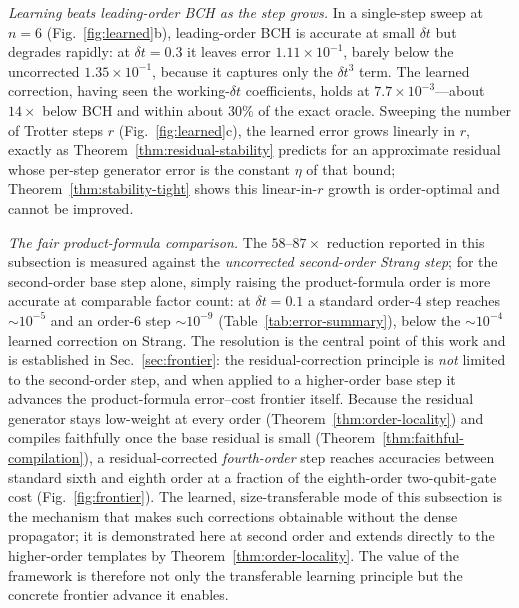 \documentclass[aps,prresearch,reprint,superscriptaddress,nofootinbib,amsmath,amssymb]{revtex4-2}
\newcommand{\dt}{\delta t}
\begin{document}
\emph{Learning beats leading-order BCH as the step grows.} In a single-step sweep at $n=6$ (Fig.~\ref{fig:learned}b), leading-order BCH is accurate at small $\dt$ but degrades rapidly: at $\dt=0.3$ it leaves error $1.11\times10^{-1}$, barely below the uncorrected $1.35\times10^{-1}$, because it captures only the $\dt^3$ term. The learned correction, having seen the working-$\dt$ coefficients, holds at $7.7\times10^{-3}$---about $14\times$ below BCH and within about $30\%$ of the exact oracle. Sweeping the number of Trotter steps $r$ (Fig.~\ref{fig:learned}c), the learned error grows linearly in $r$, exactly as Theorem~\ref{thm:residual-stability} predicts for an approximate residual whose per-step generator error is the constant $\eta$ of that bound; Theorem~\ref{thm:stability-tight} shows this linear-in-$r$ growth is order-optimal and cannot be improved.

\emph{The fair product-formula comparison.} The $58$--$87\times$ reduction reported in this subsection is measured against the \emph{uncorrected second-order Strang step}; for the second-order base step alone, simply raising the product-formula order is more accurate at comparable factor count: at $\dt=0.1$ a standard order-4 step reaches $\sim10^{-5}$ and an order-6 step $\sim10^{-9}$ (Table~\ref{tab:error-summary}), below the $\sim10^{-4}$ learned correction on Strang. The resolution is the central point of this work and is established in Sec.~\ref{sec:frontier}: the residual-correction principle is \emph{not} limited to the second-order step, and when applied to a higher-order base step it advances the product-formula error--cost frontier itself. Because the residual generator stays low-weight at every order (Theorem~\ref{thm:order-locality}) and compiles faithfully once the base residual is small (Theorem~\ref{thm:faithful-compilation}), a residual-corrected \emph{fourth-order} step reaches accuracies between standard sixth and eighth order at a fraction of the eighth-order two-qubit-gate cost (Fig.~\ref{fig:frontier}). The learned, size-transferable mode of this subsection is the mechanism that makes such corrections obtainable without the dense propagator; it is demonstrated here at second order and extends directly to the higher-order templates by Theorem~\ref{thm:order-locality}. The value of the framework is therefore not only the transferable learning principle but the concrete frontier advance it enables.
\end{document}
